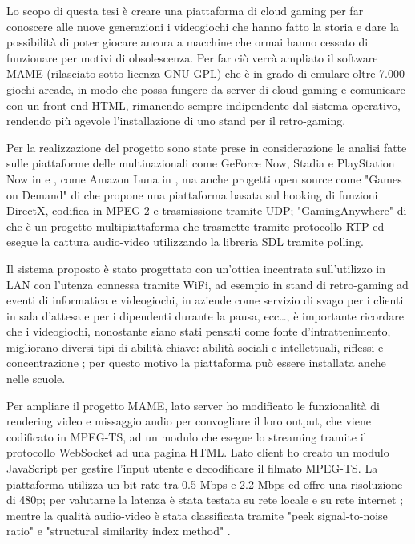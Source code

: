 Lo scopo di questa tesi è creare una piattaforma di cloud gaming per far conoscere alle nuove generazioni i videogiochi che hanno fatto la storia e dare la possibilità di poter giocare ancora a macchine che ormai hanno cessato di funzionare per motivi di obsolescenza. Per far ciò verrà ampliato il software MAME (rilasciato sotto licenza GNU-GPL) che è in grado di emulare oltre 7.000 giochi arcade, in modo che possa fungere da server di cloud gaming e comunicare con un front-end HTML, rimanendo sempre indipendente dal sistema operativo, rendendo più agevole l’installazione di uno stand per il retro-gaming. 

Per la realizzazione del progetto sono state prese in considerazione le analisi fatte sulle piattaforme delle multinazionali come GeForce Now, Stadia e PlayStation Now in \parencite{A_Network_Analysis_on_Cloud_Gaming_Stadia_GeForce_Now_and_PSNow} e \parencite{Network_Analysis_of_the_Sony_Remote_Play_System}, come Amazon Luna in \parencite{Amazon_Luna_WebRTC}, ma anche progetti open source come "Games on Demand" di \parencite{ARealTimeStreamingGamesonDemandSystem} che propone una piattaforma basata sul hooking di funzioni DirectX, codifica in MPEG-2 e trasmissione tramite UDP; "GamingAnywhere" di \parencite{GamingAnywhere} che è un progetto multipiattaforma che trasmette tramite protocollo RTP ed esegue la cattura audio-video utilizzando la libreria SDL tramite polling.

Il sistema proposto è stato progettato con un'ottica incentrata sull'utilizzo in LAN con l'utenza connessa tramite WiFi, ad esempio in stand di retro-gaming ad eventi di informatica e videogiochi, in aziende come servizio di svago per i clienti in sala d'attesa e per i dipendenti durante la pausa, ecc\dots, è importante ricordare che i videogiochi, nonostante siano stati pensati come fonte d'intrattenimento, migliorano diversi tipi di abilità chiave: abilità sociali e intellettuali, riflessi e concentrazione \parencite{Use_of_Cloud_Gaming_in_Education}; per questo motivo la piattaforma può essere installata anche nelle scuole.

Per ampliare il progetto MAME, lato server ho modificato le funzionalità di rendering video e missaggio audio per convogliare il loro output, che viene codificato in MPEG-TS, ad un modulo che esegue lo streaming tramite il protocollo WebSocket ad una pagina HTML. Lato client ho creato un modulo JavaScript per gestire l'input utente e decodificare il filmato MPEG-TS. La piattaforma utilizza un bit-rate tra 0.5 Mbps e 2.2 Mbps ed offre una risoluzione di 480p; per valutarne la latenza è stata testata su rete locale e su rete internet \parencite{Latency_analysis_for_M2M}; mentre la qualità audio-video è stata classificata tramite "peek signal-to-noise ratio" e "structural similarity index method" \parencite{Cloud_Gaming_Architecture_and_Performance}.



